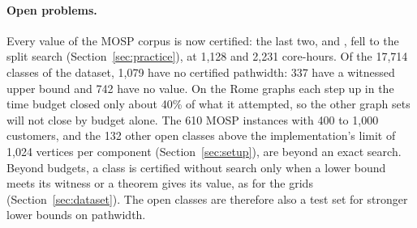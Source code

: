 \paragraph{Open problems.} Every value of the MOSP corpus is now certified: the
last two,  and , fell to the
split search (Section~\ref{sec:practice}), at 1,128 and 2,231 core-hours. Of the 17,714 classes of the dataset, 1,079 have no certified pathwidth: 337 have a witnessed upper bound and 742 have no
value. On the Rome graphs each step up in the time budget closed only about
40\% of what it attempted, so the other graph sets will not close by budget alone.
The 610 MOSP instances with 400 to 1,000 customers, and the 132 other open classes above
the implementation's limit of 1,024 vertices per component
(Section~\ref{sec:setup}), are beyond an exact search. Beyond budgets, a class is certified without search
only when a lower bound meets its witness or a theorem gives its value, as for
the grids (Section~\ref{sec:dataset}). The
open classes are therefore also a test set for stronger lower bounds on
pathwidth.
